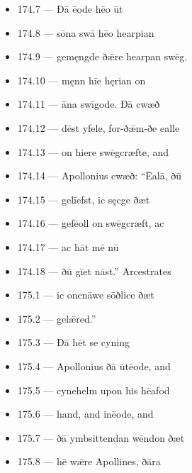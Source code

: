 \begin{itemize}
\item 174.7 — Ðā ēode hēo ūt
\item 174.8 — sōna swā hēo hearpian
\item 174.9 — gemęngde ðǣre hearpan swēg.
\item 174.10 — męnn hīe hęrian on
\item 174.11 — āna swīgode. Ðā cwæð
\item 174.12 — dēst yfele, for-ðǣm-ðe ealle
\item 174.13 — on hiere swēgcræfte, and
\item 174.14 — Apollonius cwæð: “Ēalā, ðū
\item 174.15 — gelīefst, ic sęcge ðæt
\item 174.16 — gefēoll on swēgcræft, ac
\item 174.17 — ac hāt mē nū
\item 174.18 — ðū gīet nāst.” Arcestrates
\item 175.1 — ic oncnāwe sōðlice ðæt
\item 175.2 — gelǣred.”
\item 175.3 — Ðā hēt se cyning
\item 175.4 — Apollonius ðā ūtēode, and
\item 175.5 — cynehelm upon his hēafod
\item 175.6 — hand, and inēode, and
\item 175.7 — ðā ymbsittendan wēndon ðæt
\item 175.8 — hē wǣre Apollines, ðāra

\end{itemize}
